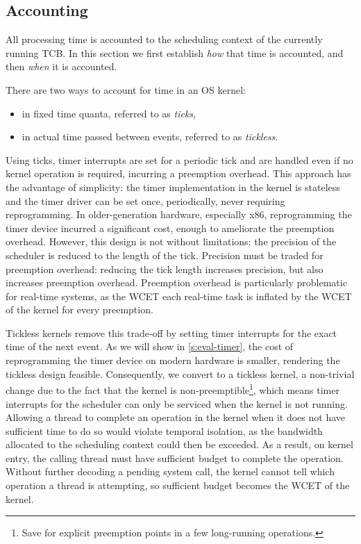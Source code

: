 \subsection{Accounting}

All processing time is accounted to the scheduling context of the currently running \gls{TCB}. 
In this section we first establish \emph{how} that time is accounted, and then \emph{when} it is
accounted.

There are two ways to account for time in an \gls{OS} kernel:
\begin{itemize}
    \item in fixed time quanta, referred to as \emph{ticks},
    \item in actual time passed between events, referred to as \emph{tickless}.
\end{itemize}

Using ticks, timer interrupts are set for a periodic tick and are
handled even if no kernel operation is required, incurring a preemption overhead.
This approach has the advantage of simplicity: the timer implementation in the kernel is 
stateless and the timer driver can be set once, periodically, never requiring reprogramming. 
In older-generation hardware, especially x86, reprogramming the timer device incurred a 
significant cost, enough to ameliorate the preemption overhead. 
However, this design is not without limitations:
the precision of the scheduler is reduced to the length of the tick. Precision must be traded for
preemption overhead: reducing the tick length increases precision, but also increases 
preemption overhead. Preemption overhead is particularly problematic for real-time systems, as
the \gls{WCET} each real-time task is inflated by the \gls{WCET} of the kernel for every preemption.

Tickless kernels remove this trade-off by setting timer interrupts for the exact time of the next
event. As we will show in \cref{s:eval-timer}, the cost of reprogramming the timer device on modern
hardware is smaller, rendering the tickless design feasible. Consequently, we convert \selfour
to a tickless kernel, a non-trivial change due to the fact that the kernel is
non-preemptible\footnote{Save for
explicit preemption points in a few long-running operations.}, which means timer interrupts for the
scheduler can only be serviced when the kernel is not running. Allowing a thread to complete an
operation in the kernel when it does not have sufficient time to do so would violate temporal
isolation, as the bandwidth allocated to the scheduling context could then be exceeded. As a result,  
on kernel entry, the calling thread must have sufficient budget to complete the operation. Without
further decoding a pending system call, the kernel cannot tell which operation a thread is
attempting, so sufficient budget becomes the \gls{WCET} of the kernel.

